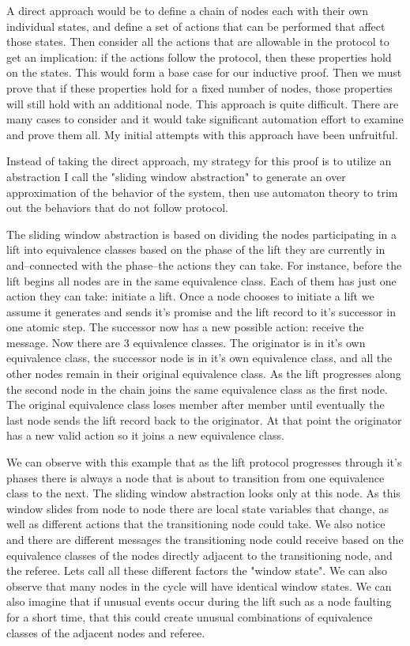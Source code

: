 \documentclass[article, onecolumn, 12pt]{IEEEtran}
\begin{document}
A direct approach would be to define a chain of nodes each with their own individual states, and define a set of actions that can be performed that affect those states. Then consider all the actions that are allowable in the protocol to get an implication: if the actions follow the protocol, then these properties hold on the states. This would form a base case for our inductive proof. Then we must prove that if these properties hold for a fixed number of nodes, those properties will still hold with an additional node. This approach is quite difficult. There are many cases to consider and it would take significant automation effort to examine and prove them all. My initial attempts with this approach have been unfruitful.

Instead of taking the direct approach, my strategy for this proof is to utilize an abstraction I call the "sliding window abstraction" to generate an over approximation of the behavior of the system, then use automaton theory to trim out the behaviors that do not follow protocol.

The sliding window abstraction is based on dividing the nodes participating in a lift into equivalence classes based on the phase of the lift they are currently in and--connected with the phase--the actions they can take. For instance, before the lift begins all nodes are in the same equivalence class. Each of them has just one action they can take: initiate a lift. Once a node chooses to initiate a lift we assume it generates and sends it's promise and the lift record to it's successor in one atomic step. The successor now has a new possible action: receive the message. Now there are 3 equivalence classes. The originator is in it's own equivalence class, the successor node is in it's own equivalence class, and all the other nodes remain in their original equivalence class. As the lift progresses along the second node in the chain joins the same equivalence class as the first node. The original equivalence class loses member after member until eventually the last node sends the lift record back to the originator. At that point the originator has a new valid action so it joins a new equivalence class. 

We can observe with this example that as the lift protocol progresses through it's phases there is always a node that is about to transition from one equivalence class to the next. The sliding window abstraction looks only at this node. As this window slides from node to node there are local state variables that change, as well as different actions that the transitioning node could take. We also notice and there are different messages the transitioning node could receive based on the equivalence classes of the nodes directly adjacent to the transitioning node, and the referee. Lets call all these different factors the "window state". We can also observe that many nodes in the cycle will have identical window states.  We can also imagine that if unusual events occur during the lift such as a node faulting for a short time, that this could create unusual combinations of equivalence classes of the adjacent nodes and referee.
\end{document}
